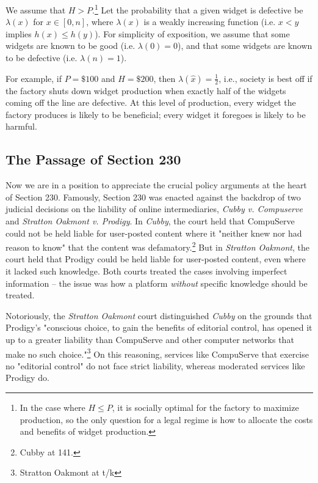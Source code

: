 We assume that $H > P$.\footnote{In the case where $H \le P$, it is socially optimal for the factory to maximize production, so the only question for a legal regime is how to allocate the costs and benefits of widget production.} Let the probability that a given widget is defective be $\lambda(x)$ for $x \in [0,n]$, where $\lambda(x)$ is a weakly increasing function (i.e. $x < y$ implies $h(x) \le h(y)$). For simplicity of exposition, we assume that some widgets are known to be good (i.e. $\lambda(0) = 0$), and that some widgets are known to be defective (i.e. $\lambda(n) = 1$). 

For example, if $P = \$100$ and $H = \$200$, then $\lambda(\hat{x}) = \frac{1}{2}$, i.e., society is best off if the factory shuts down widget production when exactly half of the widgets coming off the line are defective. At this level of production, every widget the factory produces is likely to be beneficial; every widget it foregoes is likely to be harmful.



\subsection{The Passage of Section 230}

Now we are in a position to appreciate the crucial policy arguments at the heart of Section 230. Famously, Section 230 was enacted against the backdrop of two judicial decisions on the liability of online intermediaries, \emph{Cubby v. Compuserve} and \emph{Stratton Oakmont v. Prodigy}. In \emph{Cubby}, the court held that CompuServe could not be held liable for user-posted content where it "neither knew nor had reason to know" that the content was defamatory.\footnote{Cubby at 141.} But in \emph{Stratton Oakmont}, the court held that Prodigy could be held liable for user-posted content, even where it lacked such knowledge. Both courts treated the cases involving imperfect information -- the issue was how a platform \emph{without} specific knowledge should be treated.

Notoriously, the \emph{Stratton Oakmont} court distinguished \emph{Cubby} on the grounds that Prodigy's "conscious choice, to gain the benefits of editorial control, has opened it up to a greater liability than CompuServe and other computer networks that make no such choice."\footnote{Stratton Oakmont at t/k} On this reasoning, services like CompuServe that exercise no "editorial control" do not face strict liability, whereas moderated services like Prodigy do.

